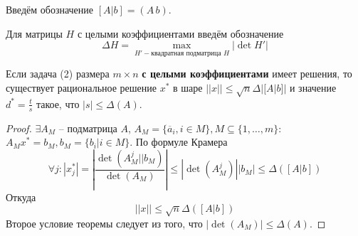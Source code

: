 \documentclass[11pt]{article}
\newcounter{th}\setcounter{th}{0}
\def\th{\par\smallskip\refstepcounter{th}\textbf{\arabic{th}}}
\newtheorem*{Theorem}{Теорема \th}
\begin{document}
Введём обозначение \([A | b] = (A\, b)\).

Для матрицы \(H\) с целыми коэффициентами введём обозначение
\begin{equation}
\Delta H = \max_{H' - \text{квадратная подматрица }H}{|\det H'|}
\end{equation}
\begin{Theorem}
Если задача (2) размера $m\times n$ \textbf{с целыми коэффициентами} имеет решения, то
существует рациональное решение $x^*$ в шаре $||x|| \leq \sqrt{n}\Delta|[A|b]|$
и значение $d^* = \frac{t}{s}$ такое, что $|s| \leq \Delta(A)$.
\end{Theorem}
\begin{proof}
$\exists A_M$ -- подматрица $A$, $A_M = \{\overline{a}_i, i \in M\}, M \subseteq \{1, \ldots, m\}$:
$A_Mx^* = b_M, b_M = \{b_i | i \in M\}$. По формуле Крамера
\begin{equation}
\forall j: |x_j^*| = \left|\frac{\det(A_M^j || b_M)}{\det(A_M)}\right| \leq |\det(A_M^j) || b_M| \leq \Delta([A | b])
\end{equation}
Откуда
\begin{equation}
||x|| \leq \sqrt{n}\Delta([A | b])
\end{equation}
Второе условие теоремы следует из того, что $|\det(A_M)| \leq \Delta(A)$.
\end{proof}
\end{document}
